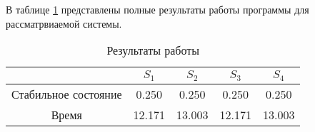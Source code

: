 В таблице \ref{tbl:resloop} представлены полные результаты работы программы для рассматрвиаемой системы.

\begin{table}[ht]
	\small
	\begin{center}
		\caption{Результаты работы}
		\label{tbl:resloop}
		\begin{tabular}{|c|c|c|c|c|}
			\hline
			& $S_1$ & $S_2$ & $S_3$ & $S_4$ \\\hline
			Стабильное состояние &  0.250 & 0.250 & 0.250 & 0.250 \\\hline
			Время & 12.171	& 13.003 & 12.171 & 13.003 \\\hline
		\end{tabular}
	\end{center}
\end{table}
